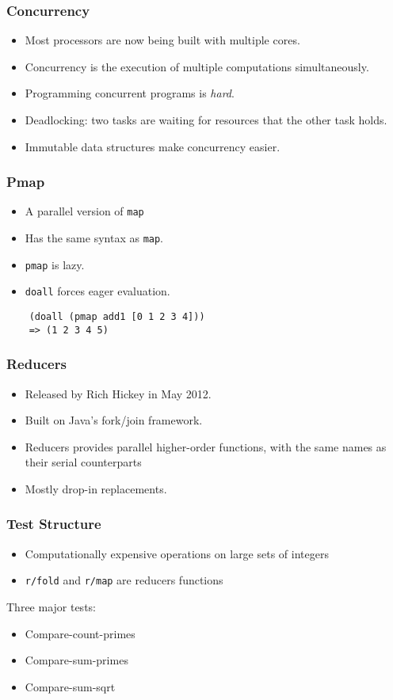 \documentclass{beamer}
\newcommand{\clocode}[1]{{\texttt {#1}}}
\begin{document}
\begin{frame}
\frametitle{Concurrency}
	\begin{itemize}
	 \item Most processors are now being built with multiple cores.
	 \item Concurrency is the execution of multiple computations simultaneously.
	 \item Programming concurrent programs is \textit{hard}.
	 \item Deadlocking: two tasks are waiting for resources that the other task holds.
	 \item Immutable data structures make concurrency easier.
	\end{itemize}	
\end{frame}
\begin{frame}[fragile]
\frametitle{Pmap}
	\begin{itemize}
	 \item A parallel version of \clocode{map}
	 \item Has the same syntax as \clocode{map}.
	 \item \clocode{pmap} is lazy.
	 \item \clocode{doall} forces eager evaluation. 
	\end{itemize}	
	\begin{verbatim}
	(doall (pmap add1 [0 1 2 3 4]))
	=> (1 2 3 4 5)
	\end{verbatim}
\end{frame}
\begin{frame}[fragile]
\frametitle{Reducers}
	\begin{itemize}
	 \item Released by Rich Hickey in May 2012.
	 \item Built on Java's fork/join framework.
	 \item Reducers provides parallel higher-order functions, with the same names as their serial counterparts
	 \item Mostly drop-in replacements.
	\end{itemize}
\end{frame}
\begin{frame}
\frametitle{Test Structure}
	\begin{itemize}
	\item Computationally expensive operations on large sets of integers
	\item \clocode{r/fold} and \clocode{r/map} are reducers functions
	\end{itemize}
	Three major tests:
	\begin{itemize}
	\item Compare-count-primes
	\item Compare-sum-primes
	\item Compare-sum-sqrt
	\end{itemize}
\end{frame}
\end{document}
